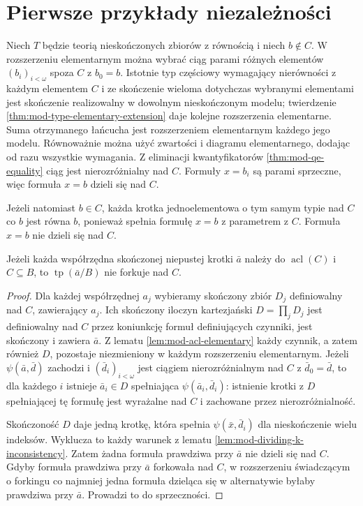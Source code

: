 \section{Pierwsze przykłady niezależności}

\begin{przyklad}
\label{ex:mod-equality-dividing}
Niech $T$ będzie teorią nieskończonych zbiorów
z równością i niech $b\notin C$.
W rozszerzeniu elementarnym można wybrać
ciąg parami różnych elementów $(b_i)_{i<\omega}$
spoza $C$ z $b_0=b$.
Istotnie typ częściowy wymagający nierówności
z każdym elementem $C$ i ze skończenie wieloma
dotychczas wybranymi elementami jest skończenie
realizowalny w dowolnym nieskończonym modelu;
twierdzenie \ref{thm:mod-type-elementary-extension}
daje kolejne rozszerzenia elementarne. Suma
otrzymanego łańcucha jest rozszerzeniem
elementarnym każdego jego modelu.
Równoważnie można użyć zwartości i diagramu elementarnego,
dodając od razu wszystkie wymagania.
Z eliminacji kwantyfikatorów
\ref{thm:mod-qe-equality} ciąg jest
nierozróżnialny nad $C$.
Formuły $x=b_i$ są parami sprzeczne,
więc formuła $x=b$ dzieli się nad $C$.

Jeżeli natomiast $b\in C$, każda krotka
jednoelementowa o tym samym typie nad $C$
co $b$ jest równa $b$, ponieważ spełnia
formułę $x=b$ z parametrem z $C$.
Formuła $x=b$ nie dzieli się nad $C$.
\end{przyklad}

\begin{lemat}
\label{lem:mod-algebraic-base-nonforking}
Jeżeli każda współrzędna skończonej niepustej
krotki $\bar a$ należy do $\operatorname{acl}(C)$
i $C\subseteq B$, to $\operatorname{tp}(\bar a/B)$
nie forkuje nad $C$.
\end{lemat}
\begin{proof}
Dla każdej współrzędnej $a_j$ wybieramy
skończony zbiór $D_j$ definiowalny nad $C$,
zawierający $a_j$. Ich skończony iloczyn
kartezjański $D=\prod_j D_j$ jest definiowalny
nad $C$ przez koniunkcję formuł definiujących
czynniki, jest skończony i zawiera $\bar a$.
Z lematu \ref{lem:mod-acl-elementary}
każdy czynnik, a zatem również $D$,
pozostaje niezmieniony w każdym rozszerzeniu
elementarnym.
Jeżeli $\psi(\bar a,\bar d)$ zachodzi i
$(\bar d_i)_{i<\omega}$ jest ciągiem
nierozróżnialnym nad $C$ z $\bar d_0=\bar d$,
to dla każdego $i$ istnieje $\bar a_i\in D$
spełniająca $\psi(\bar a_i,\bar d_i)$:
istnienie krotki z $D$ spełniającej tę formułę
jest wyrażalne nad $C$ i zachowane
przez nierozróżnialność.

Skończoność $D$ daje jedną krotkę,
która spełnia $\psi(\bar x,\bar d_i)$
dla nieskończenie wielu indeksów.
Wyklucza to każdy warunek z lematu
\ref{lem:mod-dividing-k-inconsistency}.
Zatem żadna formuła prawdziwa przy $\bar a$
nie dzieli się nad $C$.
Gdyby formuła prawdziwa przy $\bar a$
forkowała nad $C$, w rozszerzeniu
świadczącym o forkingu co najmniej jedna
formuła dzieląca się w alternatywie
byłaby prawdziwa przy $\bar a$.
Prowadzi to do sprzeczności.
\end{proof}

